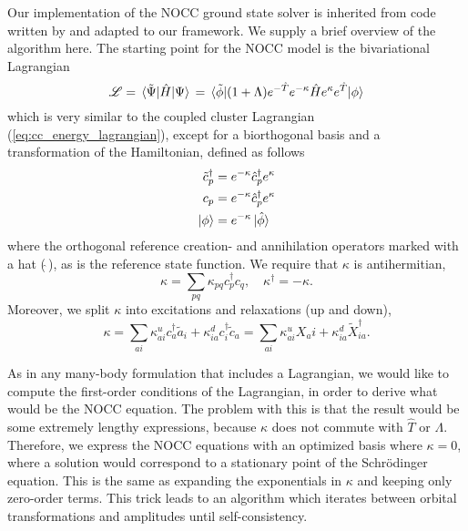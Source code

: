     Our implementation of the NOCC ground state solver is inherited from code written by
    \citeauthor{myhre2018demonstrating} and 
    adapted to our 
    framework. We supply a brief overview of the algorithm here. The starting point for the 
    NOCC model is the bivariational Lagrangian
    \begin{equation}
        \label{eq:nocc_lagrangian}
        \mathscr{L} = \mel*{\tilde{\Psi}}{\hat{H}}{\Psi} \\
            = \mel*{\tilde{\phi}}
                {
                (1 + \Lambda) e^{-\hat{T}}e^{-\kappa}\hat{H}e^{\kappa}e^{\hat{T}}
                }{\phi}
    \end{equation}
    which is very similar to the coupled cluster Lagrangian (\autoref{eq:cc_energy_lagrangian}),
    except for a biorthogonal basis and a transformation of the Hamiltonian, defined 
    as follows
    \begin{equation}
        \begin{aligned}
            \tilde{c}_p^\dagger &= e^{-\kappa}\hat{c}_p^\dagger e^\kappa \\
            c_p &= e^{-\kappa} \hat{c}_p^\dagger e^\kappa \\
            \ket{\phi} &= e^{-\kappa}\ket*{\hat{\phi}}
        \end{aligned}
    \end{equation}
    where the orthogonal reference creation- and annihilation operators marked with a hat
    ($\hat{\ }$), as is the reference state function. We require that $\kappa$ is antihermitian,
    \begin{equation}
        \kappa = \sum_{pq} \kappa_{pq}c^\dagger_p c_q, \quad \kappa^\dagger = -\kappa.
    \end{equation}
    Moreover, we split $\kappa$ into excitations and relaxations (up and down),
    \begin{equation}
        \label{eq:agg_kappa}
        \kappa = \sum_{ai} \kappa^u_{ai}c^\dagger_a \tilde{a}_i
            + \kappa^d_{ia} c^\dagger_i \tilde{c}_a
            = \sum_{ai} \kappa^u_{ai} X_ai + \kappa^d_{ia} \tilde{X}^\dagger_{ia}.
    \end{equation} 
    
    As in any many-body formulation that includes a Lagrangian, we would like to compute 
    the first-order conditions of the Lagrangian, in order to derive what would be the 
    NOCC equation. The problem with this is that the result would be some extremely 
    lengthy expressions, because $\kappa$ does not commute with $\hat{T}$ or $\Lambda$.
    Therefore, we express the NOCC equations with an optimized basis where $\kappa=0$,
    where a solution would correspond to a stationary point of the Schrödinger equation.
    This is the same as expanding the exponentials in $\kappa$ and keeping only zero-order 
    terms. This trick leads to an algorithm which iterates between orbital transformations 
    and amplitudes until self-consistency.

